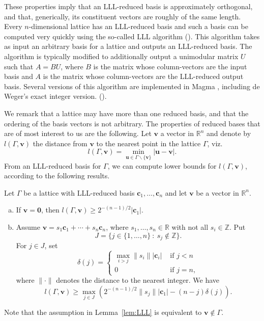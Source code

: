 These properties imply that an LLL-reduced basis is approximately orthogonal, and that, generically, its constituent vectors are roughly of the same length. Every $n$-dimensional lattice has an LLL-reduced basis and such a basis can be computed very quickly using the so-called LLL algorithm (). This algorithm takes as input an arbitrary basis for a lattice and outputs an LLL-reduced basis. The algorithm is typically modified to additionally output a unimodular matrix $U$ such that $A = BU$, where $B$ is the matrix whose column-vectors are the input basis and $A$ is the matrix whose column-vectors are the LLL-reduced output basis. Several versions of this algorithm are implemented in Magma , including de Weger's exact integer version. ().

We remark that a lattice may have more than one reduced basis, and that the ordering of the basis vectors is not arbitrary. The properties of reduced bases that are of most interest to us are the following. Let $\mathbf{v}$ a vector in $\mathbb{R}^n$ and denote by $l(\Gamma,\mathbf{v})$ the distance from $\mathbf{v}$ to the nearest point in the lattice $\Gamma$, viz.
\[l(\Gamma,\mathbf{v}) = \min_{\mathbf{u} \in \Gamma \backslash\{\mathbf{v}\}} |\mathbf{u} - \mathbf{v}|.\]
From an LLL-reduced basis for $\Gamma$, we can compute lower bounds for $l(\Gamma,\mathbf{v})$, according to the following results. 

\begin{lemma} \label{lem:LLL}
Let $\Gamma$ be a lattice with LLL-reduced basis $\mathbf{c}_1, \dots, \mathbf{c}_n$ and let $\mathbf{v}$ be a vector in $\mathbb{R}^n$. 
\begin{enumerate}[(a)]
\item If $\mathbf{v} = \mathbf{0}$, then $l(\Gamma,\mathbf{v}) \geq 2^{-(n-1)/2}|\mathbf{c}_1|$.
\item Assume $\mathbf{v} = s_1\mathbf{c}_1 + \cdots + s_n \mathbf{c}_n$, where $s_1, \dots, s_n \in \mathbb{R}$ with not all $s_i \in \mathbb{Z}$. Put 
\[J = \{j \in \{1, \dots, n\} \ : \ s_j \notin \mathbb{Z} \}.\]
For $j \in J$, set 
\[\delta(j) = 
\begin{cases}
\max_{i > j} \|s_i \| |\mathbf{c}_i| 	& \text{ if } j < n\\
0 							& \text{ if } j = n,
\end{cases}\]
where $\| \cdot \|$ denotes the distance to the nearest integer. We have
\[l(\Gamma,\mathbf{v}) \geq \max_{j \in J}\left(2^{-(n-1)/2}\| s_j\| |\mathbf{c}_1| - (n-j)\delta(j)\right).\]
\end{enumerate}
\end{lemma}
Note that the assumption in Lemma~\ref{lem:LLL} is equivalent to ${\mathbf{v} \notin \Gamma}$. 

